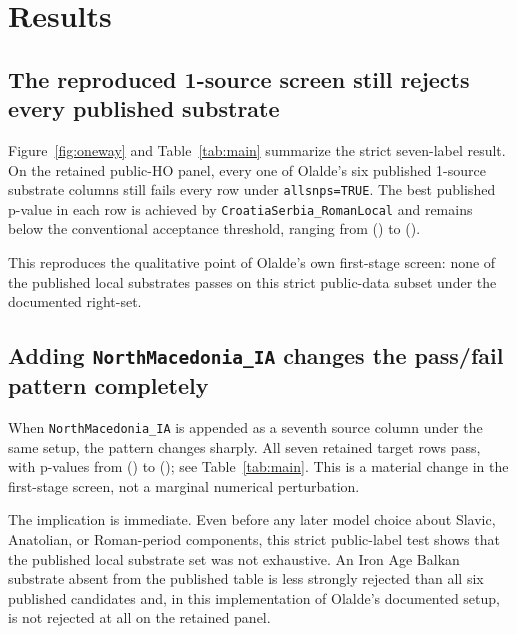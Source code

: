 \documentclass[11pt]{article}
\begin{document}
\section{Results}

\subsection{The reproduced 1-source screen still rejects every published substrate}

\begin{sloppypar}
Figure~\ref{fig:oneway} and Table~\ref{tab:main} summarize the strict
seven-label result. On the retained public-HO panel, every one of Olalde's six
published 1-source substrate columns still fails every row under
\nolinkurl{allsnps=TRUE}. The best published p-value in each row is achieved by
\nolinkurl{CroatiaSerbia_RomanLocal} and remains below the conventional
acceptance threshold, ranging from \BestPublishedMinP{} (\texttt{\BestPublishedMinTarget{}})
to \BestPublishedMaxP{} (\texttt{\BestPublishedMaxTarget{}}).
\end{sloppypar}

This reproduces the qualitative point of Olalde's own first-stage screen: none
of the published local substrates passes on this strict public-data subset
under the documented right-set.

\subsection{Adding \texttt{NorthMacedonia\_IA} changes the pass/fail pattern completely}

When \texttt{NorthMacedonia\_IA} is appended as a seventh source column under
the same setup, the pattern changes sharply. All seven retained target rows
pass, with p-values from \NorthmacMinP{} (\texttt{\NorthmacMinTarget{}}) to \NorthmacMaxP{}
(\texttt{\NorthmacMaxTarget{}}); see Table~\ref{tab:main}. This is a material change in
the first-stage screen, not a marginal numerical perturbation.

The implication is immediate. Even before any later model choice about Slavic,
Anatolian, or Roman-period components, this strict public-label test shows that
the published local substrate set was not exhaustive. An Iron Age Balkan
substrate absent from the published table is less strongly rejected than all
six published candidates and, in this implementation of Olalde's documented
setup, is not rejected at all on the retained panel.
\end{document}
